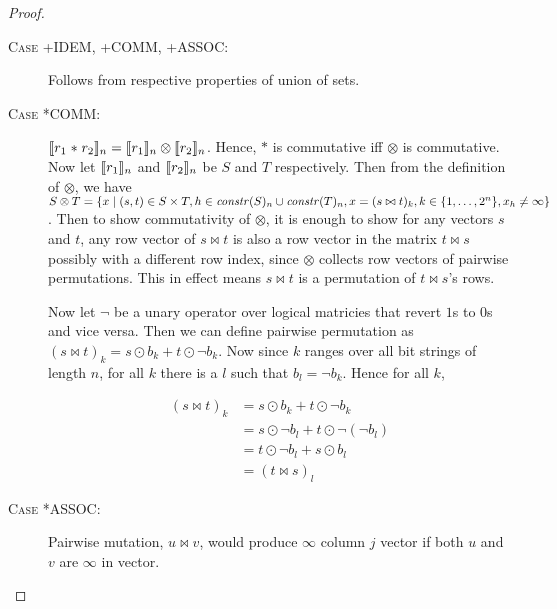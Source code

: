 \begin{proof}
\begin{description}
  \item[\textsc{Case +IDEM, +COMM, +ASSOC}:]
    Follows from respective properties of union of sets.
  \item[\textsc{Case *COMM}:] $\llbracket{r_1 \; \texttt{$\ast$} \; r_2}\rrbracket_n =
    \llbracket{r_1}\rrbracket_n \otimes \llbracket{r_2}\rrbracket_n$. Hence, $\texttt{$\ast$}$ is
    commutative iff $\otimes$ is commutative. Now let $\llbracket{r_1}\rrbracket_n$ and
    $\llbracket{r_2}\rrbracket_n$ be $S$ and $T$ respectively. Then from the definition of
    $\otimes$, we have $S \otimes T = \{ x \;|\; (s,t) \in S \times T,
    h \in \mathit{constr}(S)_{n} \cup \mathit{constr}(T)_{n}, x = (s \bowtie t)_k,
    k \in \{ 1, \ldots, 2^n \}, x_h \neq \infty \}$. Then to show commutativity
    of $\otimes$, it is enough to show for any vectors $s$ and $t$, any row
    vector of $s \bowtie t$ is also a row vector in the matrix $t \bowtie s$
    possibly with a different row index, since $\otimes$ collects row vectors of
    pairwise permutations. This in effect means $s \bowtie t$ is a permutation
    of $t \bowtie s$'s rows.

    Now let $\neg$ be a unary operator over logical matricies that revert $1$s
    to $0$s and vice versa. Then we can define pairwise permutation as
    $(s \bowtie t)_k = s \odot b_k + t \odot \neg b_k$. Now since $k$ ranges
    over all bit strings of length $n$, for all $k$ there is a $l$ such that
    $b_l = \neg b_k$. Hence for all $k$,

    \begin{align*}
      (s \bowtie t)_k &= s \odot b_k + t \odot \neg b_k \\
                      &= s \odot \neg b_l + t \odot \neg (\neg b_l) \\
                      &= t \odot \neg b_l + s \odot b_l \\
                      &= (t \bowtie s)_l
    \end{align*}

  \item[\textsc{Case *ASSOC}:]
    \begin{lemma}\label{lem:bowinf}
      Pairwise mutation, $u \bowtie v$, would produce $\infty$ column $j$ vector
      if both $u$ and $v$ are $\infty$ in vector.
    \end{lemma}


\end{description}
\end{proof}
